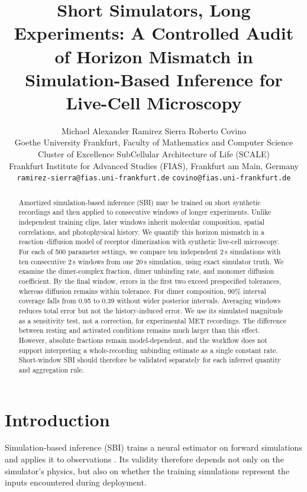 \documentclass{article}
\title{Short Simulators, Long Experiments: A Controlled Audit of Horizon
Mismatch in Simulation-Based Inference for Live-Cell Microscopy}
\author{%
  Michael Alexander Ramirez Sierra \quad Roberto Covino\\
  Goethe University Frankfurt, Faculty of Mathematics and Computer Science\\
  Cluster of Excellence SubCellular Architecture of Life (SCALE)\\
  Frankfurt Institute for Advanced Studies (FIAS), Frankfurt am Main, Germany\\
  \texttt{ramirez-sierra@fias.uni-frankfurt.de} \quad \texttt{covino@fias.uni-frankfurt.de}\\
}
\begin{document}
\maketitle

\begin{abstract}
Amortized simulation-based inference (SBI) may be trained on short synthetic
recordings and then applied to consecutive windows of longer experiments.
Unlike independent training clips, later windows inherit molecular
composition, spatial correlations, and photophysical history. We quantify
this horizon mismatch in a reaction--diffusion model of receptor dimerization
with synthetic live-cell microscopy. For each of 500 parameter settings, we
compare ten independent 2\,s simulations with ten consecutive 2\,s windows
from one 20\,s simulation, using exact simulator truth. We examine the
dimer-complex fraction, dimer unbinding rate, and monomer diffusion
coefficient. By the final window, errors in the first two exceed prespecified
tolerances, whereas diffusion remains within tolerance. For dimer
composition, 90\% interval coverage falls from 0.95 to 0.39 without wider
posterior intervals. Averaging windows reduces total error but not the
history-induced error. We use its simulated magnitude as a sensitivity test,
not a correction, for experimental MET recordings. The difference between
resting and activated conditions remains much larger than this effect.
However, absolute fractions remain model-dependent, and the workflow does not
support interpreting a whole-recording unbinding estimate as a single
constant rate. Short-window SBI should therefore be validated separately for
each inferred quantity and aggregation rule.
\end{abstract}

\section{Introduction}
\label{sec:intro}

Simulation-based inference (SBI) trains a neural estimator on forward
simulations and applies it to observations
\citep{cranmer2020frontier,greenberg2019automatic,boelts2025sbi}.
Its validity therefore depends not only on the simulator's physics, but also
on whether the training simulations represent the inputs encountered during
deployment.
\end{document}
